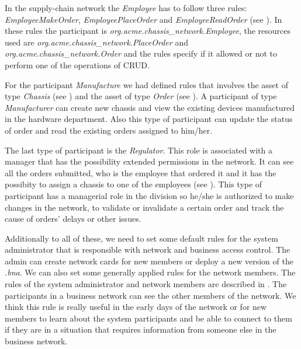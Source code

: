In the supply-chain network the \emph{Employee} has to follow three rules: \emph{EmployeeMakeOrder}, \emph{EmployeePlaceOrder} and \emph{EmployeeReadOrder}
(see ). In these rules the participant is \emph{org.acme.chassis_network.Employee}, the resources used are \emph{org.acme.chassis_network.PlaceOrder} and \emph{org.acme.chassis_network.Order} and the rules specify if it allowed or not to perform one of the operations of CRUD. 


For the participant \emph{Manufacture} we had defined rules that involves the asset of type \emph{Chassis} (see ) and the asset of type \emph{Order} (see ). A participant of type \emph{Manufacturer} can create new chassis and view the existing devices manufactured in the hardware department. Also this type of participant can update the status of order and read the existing orders assigned to him/her.



The last type of participant is the \emph{Regulator}. This role is associated with a manager that has the possibility extended permissions in the network. It can see all the orders submitted, who is the employee that ordered it and it has the possibity to assign a chassis to one of the employees (see ). This type of participant has a managerial role in the division so he/she is authorized to make changes in the network, to validate or invalidate a certain order and track the cause of orders' delays or other issues.


Additionally to all of these, we need to set some default rules for the system administrator that is responsible with network and business access control.  The admin can create network cards for new members or deploy a new version of the \emph{.bna}. We can also set some generally applied rules for the network members. The rules of the system administrator and network members are described in . The participants in a business network can see the other members of the network. We think this rule is really useful in the early days of the network or for new members to learn about the system participants and be able to connect to them if they are in a situation that requires information from someone else in the business network. 

